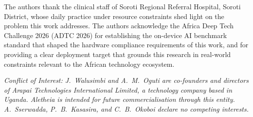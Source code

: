 \documentclass[journal]{IEEEtran}
\begin{document}
The authors thank the clinical staff of Soroti Regional Referral
Hospital, Soroti District, whose daily practice under resource
constraints shed light on the problem this work addresses. The authors acknowledge the Africa Deep
Tech Challenge 2026 (ADTC 2026) for establishing the on-device
AI benchmark standard that shaped the hardware compliance
requirements of this work, and for providing a clear deployment
target that grounds this research in real-world constraints
relevant to the African technology ecosystem.

\textit{\textit{Conflict of Interest}: J.~Walusimbi and A.~M.~Oguti are
co-founders and directors of Arapai Technologies International Limited, a technology company based in Uganda. Aletheia is
intended for future commercialisation through this entity.
A.~Sserwadda, P.~B.~Kasasira, and C.~B.~Okoboi declare no
competing interests.}
\end{document}
